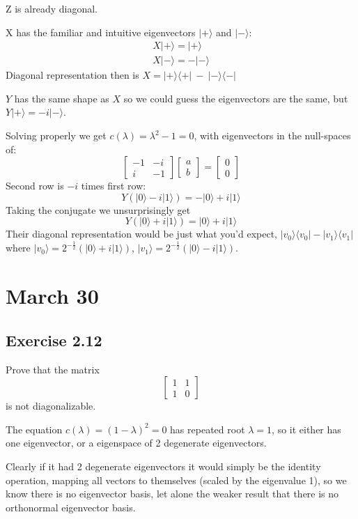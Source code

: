 \documentclass[]{article}
\begin{document}
Z is already diagonal.

X has the familiar and intuitive eigenvectors $|+\rangle$ and $|-\rangle$:
\begin{align*}
X|+\rangle = |+\rangle \\
X|-\rangle = -|-\rangle
\end{align*}
Diagonal representation then is $X = |+\rangle\langle+|\ -\ |-\rangle\langle-|$

$Y$ has the same shape as $X$ so we could guess the eigenvectors are the same, but $Y|+\rangle = -i|-\rangle$.

Solving properly we get $c(\lambda) = \lambda^2 - 1 = 0$, with eigenvectors in the null-spaces of:
\[
\left[\begin{matrix}-1&-i\\i&-1\end{matrix}\right]
\left[\begin{matrix}a\\b\end{matrix}\right]
=\left[\begin{matrix}0\\0\end{matrix}
\right]
\]
Second row is $-i$ times first row:
\[Y(|0\rangle -i |1\rangle) = -|0\rangle +i|1\rangle\]
Taking the conjugate we unsurprisingly get
\[Y(|0\rangle +i |1\rangle) = |0\rangle +i|1\rangle\]
Their diagonal representation would be just what you'd expect, $|v_0\rangle\langle v_0| - |v_1\rangle\langle v_1|$ where $|v_0\rangle = 2^{-\frac{1}{2}}\left(|0\rangle + i|1\rangle\right)$, $|v_1\rangle = 2^{-\frac{1}{2}}\left(|0\rangle - i|1\rangle\right)$.

\section{March 30}
\subsection{Exercise 2.12}
Prove that the matrix
\[\left[\begin{matrix}1&1\\1&0\end{matrix}\right]\]
is not diagonalizable.

The equation $c(\lambda) = (1-\lambda)^2 = 0$ has repeated root $\lambda = 1$, so it either has one eigenvector, or a eigenspace of 2 degenerate eigenvectors.

Clearly if it had 2 degenerate eigenvectors it would simply be the identity operation, mapping all vectors to themselves (scaled by the eigenvalue 1), so we know there is no eigenvector basis, let alone the weaker result that there is no orthonormal eigenvector basis.
\end{document}
